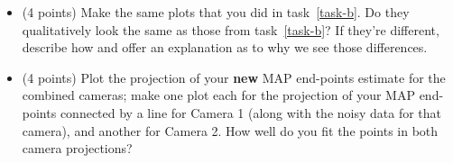 \documentclass[10pt]{article}
\begin{document}
\begin{enumerate}
\begin{itemize}
\item (4 points) Make the same plots that you did in task~\ref{task-b}.  Do they qualitatively look the same as those from task~\ref{task-b}?  If they're different, describe how and offer an explanation as to why we see those differences.


\item (4 points) Plot the projection of your {\bf new} MAP end-points estimate for the combined cameras; make one plot each for the projection of your MAP end-points connected by a line for Camera 1 (along with the noisy data for that camera), and another for Camera 2.  How well do you fit the points in both camera projections?


\end{itemize}

\end{enumerate}
\end{document}

